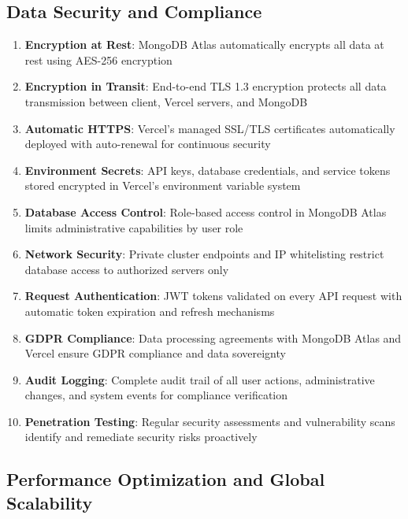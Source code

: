\documentclass[12pt,a4paper]{report}
\begin{document}
\subsection{Data Security and Compliance}

\begin{enumerate}[label=\roman*)]
    \item \textbf{Encryption at Rest}: MongoDB Atlas automatically encrypts all data at rest using AES-256 encryption
    \item \textbf{Encryption in Transit}: End-to-end TLS 1.3 encryption protects all data transmission between client, Vercel servers, and MongoDB
    \item \textbf{Automatic HTTPS}: Vercel's managed SSL/TLS certificates automatically deployed with auto-renewal for continuous security
    \item \textbf{Environment Secrets}: API keys, database credentials, and service tokens stored encrypted in Vercel's environment variable system
    \item \textbf{Database Access Control}: Role-based access control in MongoDB Atlas limits administrative capabilities by user role
    \item \textbf{Network Security}: Private cluster endpoints and IP whitelisting restrict database access to authorized servers only
    \item \textbf{Request Authentication}: JWT tokens validated on every API request with automatic token expiration and refresh mechanisms
    \item \textbf{GDPR Compliance}: Data processing agreements with MongoDB Atlas and Vercel ensure GDPR compliance and data sovereignty
    \item \textbf{Audit Logging}: Complete audit trail of all user actions, administrative changes, and system events for compliance verification
    \item \textbf{Penetration Testing}: Regular security assessments and vulnerability scans identify and remediate security risks proactively
\end{enumerate}

\subsection{Performance Optimization and Global Scalability}
\end{document}
